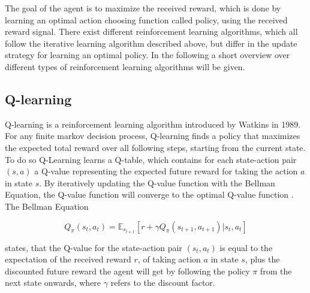 
The goal of the agent is to maximize the received reward, which is done by learning an optimal action choosing function called policy, using the received reward signal.
There exist different reinforcement learning algorithms, which all follow the iterative learning algorithm described above, but differ in the update strategy for learning an optimal policy. In the following a short overview over different types of reinforcement learning algorithms will be given.\\

\subsection{Q-learning}

Q-learning is a reinforcement learning algorithm  introduced by Watkins \cite{QLearning} in 1989. 
For any finite markov decision process, Q-learning finds a policy that maximizes the expected total reward over all following steps, starting from the current state.
To do so Q-Learning learns a Q-table, which contains for each state-action pair $(s, a)$ a Q-value representing the expected future reward for taking the action $a$ in state $s$. 
By iteratively updating the Q-value function with the Bellman Equation, the Q-value function will converge to the optimal Q-value function \cite{QLearningProof}.\\

The Bellman Equation 


\begin{equation} \label{eq:bellman_eq1}
Q_{\pi} (s_t, a_t) =\mathbb{E}_{s_{t+1}} [r + \gamma Q_\pi(s_{t+1}, a_{t+1}) | s_t, a_t]
\end{equation}

states, that the Q-value for the state-action pair $(s_t, a_t)$ is equal to the expectation of the received reward $r$, of taking action $a$ in state $s$, plus the discounted future reward the agent will get by following the policy $\pi$ from the next state onwards, where $\gamma$ refers to the discount factor.\\

